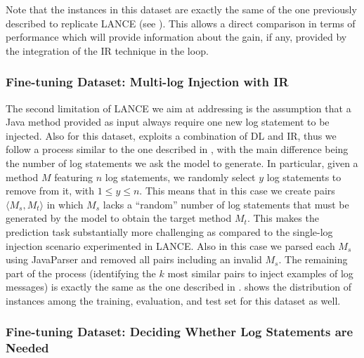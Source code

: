 Note that the instances in this dataset are exactly the same of the one previously described to replicate LANCE (see ). This allows a direct comparison in terms of performance which will provide information about the gain, if any, provided by the integration of the IR technique in the loop.

\subsubsection{Fine-tuning Dataset: Multi-log Injection with IR} \label{sec:multi-log-dataset}

The second limitation of LANCE \cite{mastropaolo2022using} we aim at addressing is the assumption that a Java method provided as input always require one new log statement to be injected. Also for this dataset, \approach exploits a combination of DL and IR, thus we follow a process similar to the one described in , with the main difference being the number of log statements we ask the model to generate. In particular, given a method $M$ featuring $n$ log statements, we randomly select $y$ log statements to remove from it, with $1 \leq y \leq n$. This means that in this case we create pairs $\langle M_s, M_t \rangle$ in which $M_s$ lacks a ``random'' number of log statements that must be generated by the model to obtain the target method $M_t$. This makes the prediction task substantially more challenging as compared to the single-log injection scenario experimented in LANCE. Also in this case we parsed each $M_s$ using JavaParser \cite{javaparser} and removed all pairs including an invalid $M_s$. The remaining part of the process (\ie identifying the $k$ most similar pairs to inject examples of log messages) is exactly the same as the one described in .  shows the distribution of instances among the training, evaluation, and test set for this dataset as well.

\subsubsection{Fine-tuning Dataset: Deciding Whether Log Statements are Needed} \label{sec:predicting-dataset}

